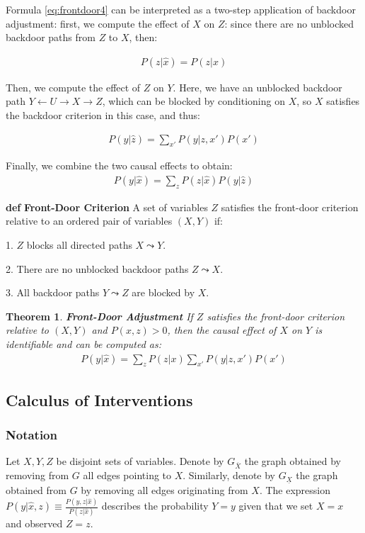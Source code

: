 \documentclass[fleqn]{article}
\def\define#1{\textbf{def} \textbf{#1}}
\newtheorem{theorem}{Theorem}
\numberwithin{equation}{section}
\numberwithin{theorem}{section}
\numberwithin{figure}{section}
\numberwithin{lemma}{section}
\numberwithin{corollary}{section}
\begin{document}
Formula \ref{eq:frontdoor4} can be interpreted as a two-step application of backdoor adjustment: first, we compute the effect of $X$ on $Z$: since there are no unblocked backdoor paths from $Z$ to $X$, then:

\begin{align}
	P(z|\hat x) = P(z|x)
\end{align}

Then, we compute the effect of $Z$ on $Y$. Here, we have an unblocked backdoor path $Y \leftarrow U \rightarrow X \rightarrow Z$, which can be blocked by conditioning on $X$, so $X$ satisfies the backdoor criterion in this case, and thus:

\begin{align}
	P(y|\hat z) = \sum\limits_{x'}P(y|z,x')P(x')
\end{align}

Finally, we combine the two causal effects to obtain:
\begin{align}
	P(y|\hat x) = \sum\limits_{z}P(z|\hat x) P(y|\hat z)
\end{align}

\define{Front-Door Criterion}
A set of variables $Z$ satisfies the front-door criterion relative to an ordered pair of variables $(X, Y)$ if:

1. $Z$ blocks all directed paths $X \leadsto Y$.

2. There are no unblocked backdoor paths $Z \leadsto X$.

3. All backdoor paths $Y \leadsto Z$ are blocked by $X$.

\begin{theorem}
	\textbf{Front-Door Adjustment} If $Z$ satisfies the front-door criterion relative to $(X, Y)$ and $P(x,z) > 0$, then the causal effect of $X$ on $Y$ is identifiable and can be computed as:
	\begin{align}
		P(y|\hat x) = \sum\limits_{z}P(z|x) \sum\limits_{x'}P(y|z,x')P(x')
	\end{align}
\end{theorem}

\subsection*{Calculus of Interventions}
\subsubsection*{Notation}
Let $X, Y, Z$ be disjoint sets of variables. Denote by $G_{\overline{X}}$ the graph obtained by removing from $G$ all edges pointing to $X$. Similarly, denote by $G_{\underline{X}}$ the graph obtained from $G$ by removing all edges originating from $X$. The expression $P(y|\hat x, z) \equiv \frac{P(y, z | \hat x)}{P(z | \hat x)}$ describes the probability $Y=y$ given that we set $X=x$ and observed $Z=z$.
\end{document}
